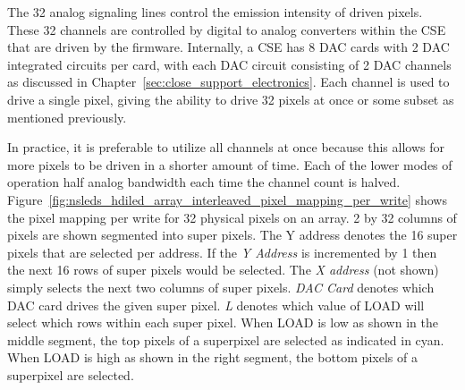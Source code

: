     The 32 analog signaling lines control the emission intensity of driven pixels. These 32 channels are controlled by digital to analog converters within the CSE that are driven by the firmware. Internally, a CSE has 8 DAC cards with 2 DAC integrated circuits per card, with each DAC circuit consisting of 2 DAC channels as discussed in Chapter~\ref{sec:close_support_electronics}. Each channel is used to drive a single pixel, giving the ability to drive 32 pixels at once or some subset as mentioned previously.

    In practice, it is preferable to utilize all channels at once because this allows for more pixels to be driven in a shorter amount of time. Each of the lower modes of operation half analog bandwidth each time the channel count is halved. Figure~\ref{fig:nsleds_hdiled_array_interleaved_pixel_mapping_per_write} shows the pixel mapping per write for 32 physical pixels on an array. 2 by 32 columns of pixels are shown segmented into super pixels. The Y address denotes the 16 super pixels that are selected per address. If the {\it Y Address} is incremented by 1 then the next 16 rows of super pixels would be selected. The {\it X address} (not shown) simply selects the next two columns of super pixels. {\it DAC Card} denotes which DAC card drives the given super pixel. {\it L} denotes which value of LOAD will select which rows within each super pixel. When LOAD is low as shown in the middle segment, the top pixels of a superpixel are selected as indicated in cyan. When LOAD is high as shown in the right segment, the bottom pixels of a superpixel are selected.

